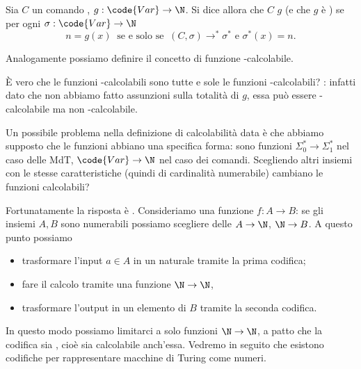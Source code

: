 \begin{definition}
    Sia $C$ un comando , $g : \code{Var} \to \N$. 
    Si dice allora che $C$  $g$ (e che $g$ è ) se per ogni $\sigma : \code{Var} \to \N$ \[
        n = g(x) \;\;\text{se e solo se}\;\; (C, \sigma) \to^\ast \sigma^\ast \text{ e } \sigma^\ast(x) = n.
    \]   
\end{definition}

Analogamente possiamo definire il concetto di funzione -calcolabile.

È vero che le funzioni -calcolabili sono tutte e sole le funzioni -calcolabili? : infatti dato che non abbiamo fatto assunzioni sulla totalità di $g$, essa può essere -calcolabile ma non -calcolabile.

Un possibile problema nella definizione di calcolabilità data è che abbiamo supposto che le funzioni abbiano una specifica forma: sono funzioni $\Sigma_0^\ast \to \Sigma_1^\ast$ nel caso delle MdT, $\code{Var} \to \N$ nel caso dei comandi. Scegliendo altri insiemi con le stesse caratteristiche (quindi di cardinalità numerabile) cambiano le funzioni calcolabili?

Fortunatamente la risposta è . Consideriamo una funzione $f : A \to B$: se gli insiemi $A, B$ sono numerabili possiamo scegliere delle  $A \to \N$, $\N \to B$. A questo punto possiamo \begin{itemize}
    \item trasformare l'input $a \in A$ in un naturale tramite la prima codifica;
    \item fare il calcolo tramite una funzione $\N \to \N$,
    \item trasformare l'output in un elemento di $B$ tramite la seconda codifica. 
\end{itemize}

In questo modo possiamo limitarci a solo funzioni $\N \to \N$, a patto che la codifica sia , cioè sia calcolabile anch'essa. Vedremo in seguito che esistono codifiche per rappresentare macchine di Turing come numeri.